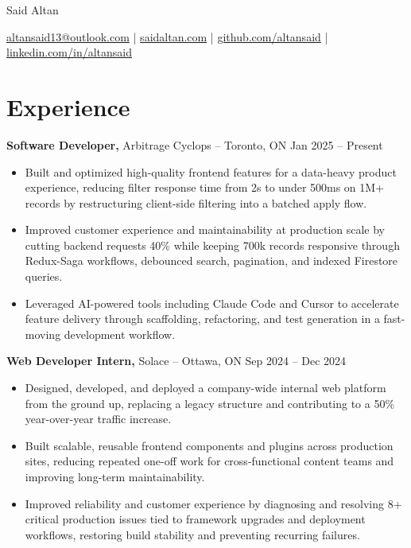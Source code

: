 \documentclass[11pt]{article}       %
\begin{document}
\centerline{\Huge Said Altan}

\vspace{10pt}

\centerline{\href{mailto:altansaid13@outlook.com}{altansaid13@outlook.com} | \href{https://saidaltan.com}{saidaltan.com} | \href{https://github.com/altansaid}{github.com/altansaid} | \href{https://www.linkedin.com/in/altansaid}{linkedin.com/in/altansaid}}


\vspace{5pt}
\section*{Experience}
\textbf{Software Developer,} {Arbitrage Cyclops} -- Toronto, ON \hfill Jan 2025 -- Present \\
\vspace{-9pt}
\begin{itemize}
  \item Built and optimized high-quality frontend features for a data-heavy product experience, reducing filter response time from 2s to under 500ms on 1M+ records by restructuring client-side filtering into a batched apply flow.
  \item Improved customer experience and maintainability at production scale by cutting backend requests 40\% while keeping 700k records responsive through Redux-Saga workflows, debounced search, pagination, and indexed Firestore queries.
  \item Leveraged AI-powered tools including Claude Code and Cursor to accelerate feature delivery through scaffolding, refactoring, and test generation in a fast-moving development workflow.
\end{itemize}

\textbf{Web Developer Intern,} {Solace} -- Ottawa, ON \hfill Sep 2024 -- Dec 2024 \\
\vspace{-9pt}
\begin{itemize}
  \item Designed, developed, and deployed a company-wide internal web platform from the ground up, replacing a legacy structure and contributing to a 50\% year-over-year traffic increase.
  \item Built scalable, reusable frontend components and plugins across production sites, reducing repeated one-off work for cross-functional content teams and improving long-term maintainability.
  \item Improved reliability and customer experience by diagnosing and resolving 8+ critical production issues tied to framework upgrades and deployment workflows, restoring build stability and preventing recurring failures.
\end{itemize}
\end{document}

